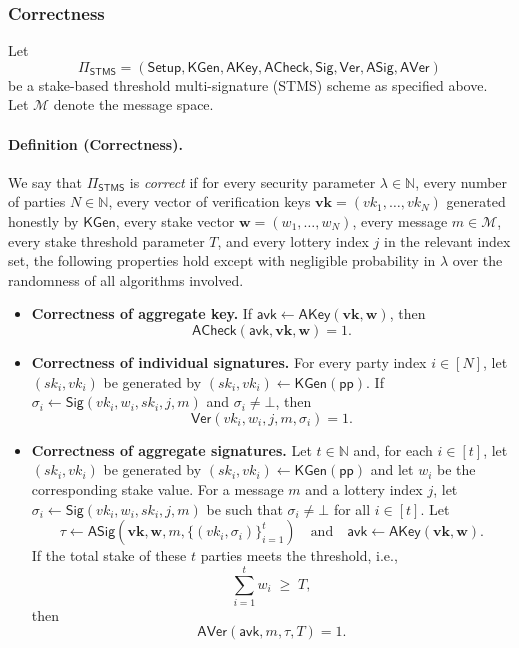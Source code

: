 \documentclass{article}
\begin{document}
\subsubsection{Correctness}

Let 
\[
  \Pi_{\mathsf{STMS}}
  =
  (\mathsf{Setup}, \mathsf{KGen}, \mathsf{AKey}, \mathsf{ACheck},
   \mathsf{Sig}, \mathsf{Ver}, \mathsf{ASig}, \mathsf{AVer})
\]
be a stake-based threshold multi-signature (STMS) scheme as specified above.  
Let $\mathcal{M}$ denote the message space.

\paragraph{Definition (Correctness).}
We say that $\Pi_{\mathsf{STMS}}$ is \emph{correct} if for every security parameter $\lambda \in \mathbb{N}$,
every number of parties $N \in \mathbb{N}$, every vector of verification keys
$\mathbf{vk} = (vk_1,\dots,vk_N)$ generated honestly by $\mathsf{KGen}$, every stake vector
$\mathbf{w} = (w_1,\dots,w_N)$, every message $m \in \mathcal{M}$, every stake threshold parameter
$T$, and every lottery index $j$ in the relevant index set, the following properties hold except with
negligible probability in $\lambda$ over the randomness of all algorithms involved.


\begin{itemize}
  \item \textbf{Correctness of aggregate key.}
        If $\mathsf{avk} \leftarrow \mathsf{AKey}(\mathbf{vk}, \mathbf{w})$, then
        \[
          \mathsf{ACheck}(\mathsf{avk}, \mathbf{vk}, \mathbf{w}) = 1.
        \]

  \item \textbf{Correctness of individual signatures.}
        For every party index $i \in [N]$, let $(sk_i, vk_i)$ be generated by
        $(sk_i, vk_i) \leftarrow \mathsf{KGen}(\mathsf{pp})$.
        If $\sigma_i \leftarrow \mathsf{Sig}(vk_i, w_i, sk_i, j, m)$ and $\sigma_i \neq \bot$, then
        \[
          \mathsf{Ver}(vk_i, w_i, j, m, \sigma_i) = 1.
        \]

  \item \textbf{Correctness of aggregate signatures.}
        Let $t \in \mathbb{N}$ and, for each $i \in [t]$, let $(sk_i, vk_i)$ be generated by
        $(sk_i, vk_i) \leftarrow \mathsf{KGen}(\mathsf{pp})$ and let $w_i$ be the corresponding stake value.
        For a message $m$ and a lottery index $j$, let
        $\sigma_i \leftarrow \mathsf{Sig}(vk_i, w_i, sk_i, j, m)$ be such that $\sigma_i \neq \bot$ for all $i \in [t]$.
        Let
        \[
          \tau \leftarrow \mathsf{ASig}(\mathbf{vk}, \mathbf{w}, m, \{(vk_i,\sigma_i)\}_{i=1}^{t})
          \quad\text{and}\quad
          \mathsf{avk} \leftarrow \mathsf{AKey}(\mathbf{vk}, \mathbf{w}).
        \]
        If the total stake of these $t$ parties meets the threshold, i.e.,
        \[
          \sum_{i=1}^{t} w_i \;\ge\; T,
        \]
        then
        \[
          \mathsf{AVer}(\mathsf{avk}, m, \tau, T) = 1.
        \]
\end{itemize}
\end{document}
